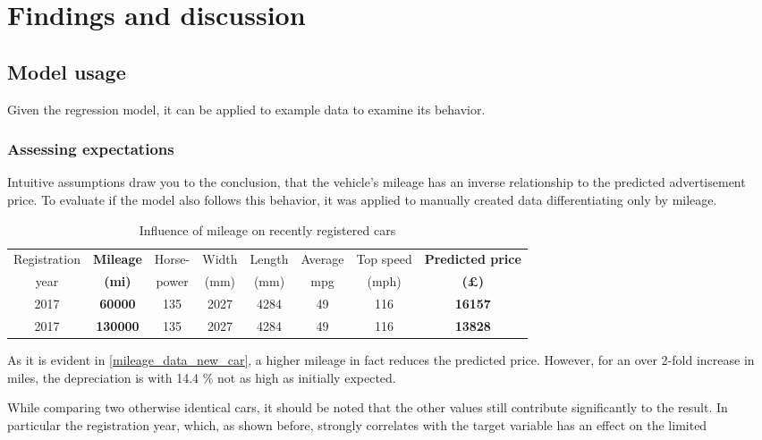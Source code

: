 \chapter{Findings and discussion}
\section{Model usage}
Given the regression model, it can be applied to example data to examine its behavior.
\subsection{Assessing expectations}
Intuitive assumptions draw you to the conclusion, that the vehicle's mileage has an inverse relationship to the predicted advertisement price.
To evaluate if the model also follows this behavior, it was applied to manually created data differentiating only by mileage.
\begin{table}[H]
    \begin{adjustbox}{width={\textwidth}}
        \begin{tabular}{|c|c|c|c|c|c|c|c|}
            \hline
            Registration & \textbf{Mileage} & Horse- & Width & Length & Average & Top speed & \textbf{Predicted price} \\[-1ex]
            year         & \textbf{(mi)}    & power  & (mm)  & (mm)   & mpg     & (mph)     & \textbf{(£)}             \\ \hline
            2017         & \textbf{60000}   & 135    & 2027  & 4284   & 49      & 116       & \textbf{16157}           \\\hline
            2017         & \textbf{130000}  & 135    & 2027  & 4284   & 49      & 116       & \textbf{13828}           \\\hline
        \end{tabular}
    \end{adjustbox}
    \caption{Influence of mileage on recently registered cars}
    \label{mileage_data_new_car}
\end{table}
As it is evident in \autoref{mileage_data_new_car}, a higher mileage in fact reduces the predicted price.
However, for an over 2-fold increase in miles, the depreciation is with 14.4 \% not as high as initially expected.
\par
While comparing two otherwise identical cars, it should be noted that the other values still contribute significantly to the
result.
\newline
In particular the registration year, which, as shown before, strongly correlates with the target variable has an effect on the limited
